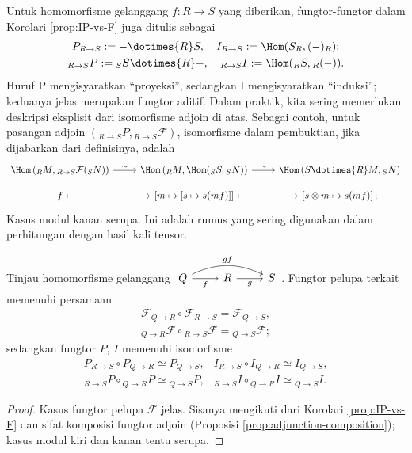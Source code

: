 Untuk homomorfisme gelanggang $f: R \to S$ yang diberikan, fungtor-fungtor dalam Korolari \ref{prop:IP-vs-F} juga ditulis sebagai  
\begin{gather*}
	P_{R \to S} := - \dotimes{R} S, \quad I_{R \to S} := \Hom(S_R, (-)_R); \\
	{}_{R \to S} P := {}_S S \dotimes{R} -, \quad {}_{R \to S} I := \Hom({}_R S, {}_R (-)).
\end{gather*}
Huruf P mengisyaratkan ``proyeksi'', sedangkan I mengisyaratkan ``induksi''; keduanya jelas merupakan fungtor aditif. Dalam praktik, kita sering memerlukan deskripsi eksplisit dari isomorfisme adjoin di atas. Sebagai contoh, untuk pasangan adjoin $({}_{R \to S} P, {}_{R \to S}\mathcal{F})$, isomorfisme dalam pembuktian, jika dijabarkan dari definisinya, adalah
\begin{equation}\label{eqn:IP-adjunction-explicit-1} \begin{tikzcd}[row sep=small]
	\Hom\left( {}_R M, {}_{R \to S} \mathcal{F} ({}_S N)\right) \arrow[r, "\sim"] & \Hom\left( {}_R M, \Hom({}_S S, {}_S N) \right) \arrow[r, "\sim"] & \Hom\left( S \dotimes{R} M, {}_S N \right) \\
	f \arrow[mapsto, r] & \left[ m \mapsto [s \mapsto s(mf)] \right] \arrow[mapsto, r] & \left[ s \otimes m \mapsto s(mf) \right] ;
\end{tikzcd}\end{equation}
Kasus modul kanan serupa. Ini adalah rumus yang sering digunakan dalam perhitungan dengan hasil kali tensor.

\begin{lemma}\label{prop:IP-transitivity}
	Tinjau homomorfisme gelanggang $\begin{tikzcd} Q \arrow[r, "f"'] \arrow[rr, bend left=25, "gf"] & R \arrow[r, "g"'] & S \end{tikzcd}$. Fungtor pelupa terkait memenuhi persamaan
	\begin{gather*}
		\mathcal{F}_{Q \to R} \circ \mathcal{F}_{R \to S} = \mathcal{F}_{Q \to S}, \\
		{}_{Q \to R} \mathcal{F} \circ {}_{R \to S} \mathcal{F} = {}_{Q \to S} \mathcal{F};
	\end{gather*}
	sedangkan fungtor $P$, $I$ memenuhi isomorfisme
	\[\begin{array}{ll}
		P_{R \to S} \circ P_{Q \to R} \simeq P_{Q \to S}, & I_{R \to S} \circ I_{Q \to R} \simeq  I_{Q \to S}, \\
		{}_{R \to S} P \circ {}_{Q \to R} P \simeq {}_{Q \to S} P, & {}_{R \to S} I \circ {}_{Q \to R} I \simeq {}_{Q \to S} I.
	\end{array}\]
\end{lemma}
\begin{proof}
	Kasus fungtor pelupa $\mathcal{F}$ jelas. Sisanya mengikuti dari Korolari \ref{prop:IP-vs-F} dan sifat komposisi fungtor adjoin (Proposisi \ref{prop:adjunction-composition}); kasus modul kiri dan kanan tentu serupa.
\end{proof}

